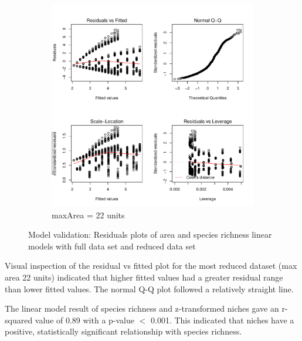 \documentclass{article}
\begin{document}
\begin{figure}[h!]
\begin{subfigure}[b]{0.4\linewidth}
    \includegraphics[width=\linewidth]{../../Results/Simulation/AreaSpeciesLmPlot_10.pdf}
    \caption{maxArea = 22 units}
  \end{subfigure}
  \caption{Model validation: Residuals plots of area and species richness linear models with full data set and reduced data set}
  \label{fig:Model validation area/species LM}
\end{figure}

Visual inspection of the residual vs fitted plot for the most reduced dataset (max area 22 units) indicated that higher fitted values had a greater residual range than lower fitted values. The normal Q-Q plot followed a relatively straight line. \bigskip

The linear model result of species richness and z-transformed niches gave an r-squared value of 0.89 with a p-value $<$ 0.001. This indicated that niches have a positive, statistically significant relationship with species richness. \bigskip
\end{document}
